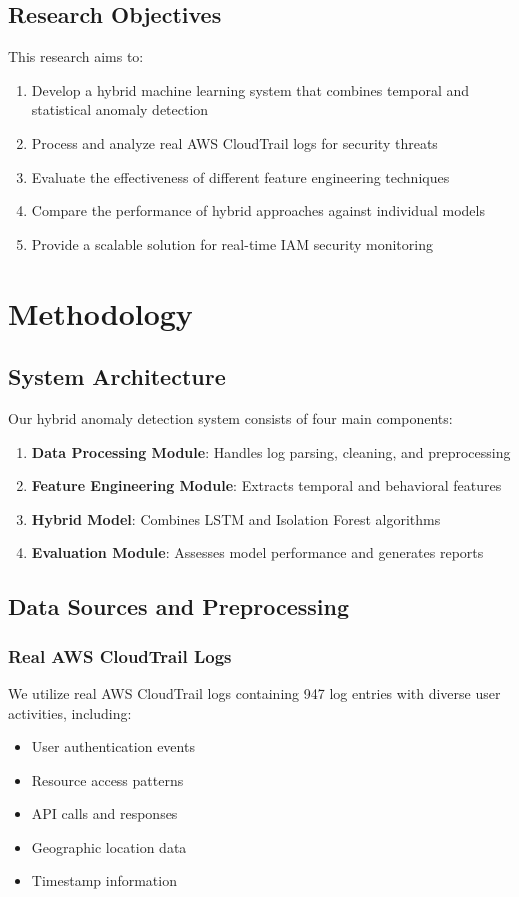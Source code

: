 \documentclass[conference]{IEEEtran}
\begin{document}
\subsection{Research Objectives}
This research aims to:

\begin{enumerate}
    \item Develop a hybrid machine learning system that combines temporal and statistical anomaly detection
    \item Process and analyze real AWS CloudTrail logs for security threats
    \item Evaluate the effectiveness of different feature engineering techniques
    \item Compare the performance of hybrid approaches against individual models
    \item Provide a scalable solution for real-time IAM security monitoring
\end{enumerate}

\section{Methodology}
\subsection{System Architecture}
Our hybrid anomaly detection system consists of four main components:

\begin{enumerate}
    \item \textbf{Data Processing Module}: Handles log parsing, cleaning, and preprocessing
    \item \textbf{Feature Engineering Module}: Extracts temporal and behavioral features
    \item \textbf{Hybrid Model}: Combines LSTM and Isolation Forest algorithms
    \item \textbf{Evaluation Module}: Assesses model performance and generates reports
\end{enumerate}

\subsection{Data Sources and Preprocessing}
\subsubsection{Real AWS CloudTrail Logs}
We utilize real AWS CloudTrail logs containing 947 log entries with diverse user activities, including:
\begin{itemize}
    \item User authentication events
    \item Resource access patterns
    \item API calls and responses
    \item Geographic location data
    \item Timestamp information
\end{itemize}
\end{document}
